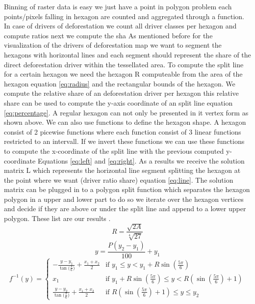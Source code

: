 		Binning of raster data is easy we just have a point in polygon problem each points/pixels falling in hexagon are counted and aggregated through a function. In case of drivers of deforestation we count all driver classes per hexagon and compute ratios next we compute the sha 
		As mentioned before for the visualization of the drivers of deforestation map we want to segment the hexagons with horizontal lines and each segment should represent the share of the direct deforestation driver within the tessellated area. To compute the split line for a certain hexagon we need the hexagon R computeable from the area of the hexagon equation \ref{eq:radius} and the rectangular bounds of the hexagon. We compute the relative share of an deforestation driver per hexagon this relative share can be used to compute the y-axis coordinate of an split line equation \ref{eq:percentage}. A regular hexagon can not only be presented in it vertex form as shown above. We can also use functions to define the hexagon shape. A hexagon consist of 2 picewise functions where each function consist of 3 linear functions restricted to an intervall. If we invert these functions we can use these functions to compute the x-coordinate of the split line with the previous computed y-coordinate Equations \ref{eq:left} and \ref{eq:right}. As a results we receive the solution matrix L which represents the horizontal line segment splitting the hexagon at the point where we want (driver ratio share) equation \ref{eq:line}. The solution matrix can be plugged in to a polygon split function which separates the hexagon polygon in a upper and lower part to do so we iterate over the hexagon vertices and decide if they are above or under the split line and append to a lower upper polygon. These list are our results .
		\begin{equation}
		\label{eq:radius}
			R = \frac{\sqrt{2A}}{\sqrt[4]{27}}
		\end{equation}
		\begin{equation}
		\label{eq:percentage}
			y = \frac{P(y_2-y_1)}{100} + y_1
		\end{equation}
		\begin{equation}
		\label{eq:left}
			f^{-1}(y) =
			\begin{cases} 
				-\frac{y - y_1}{\tan{(\frac{\pi}{6}})} + \frac{x_1 + x_2}{2} & \text{if } y_1 \le y < y_1 + R\sin{(\frac{5\pi}{6})} \\
				x_1 & \text{if } y_1 + R\sin{(\frac{5\pi}{6})} \le y < R(\sin{(\frac{5\pi}{6})} + 1) \\
				\frac{y - y_2}{\tan{(\frac{\pi}{6}})} + \frac{x_1 + x_2}{2} & \text{if } R(\sin{(\frac{5\pi}{6})} + 1) \le y \le y_2
			\end{cases}
		\end{equation}
